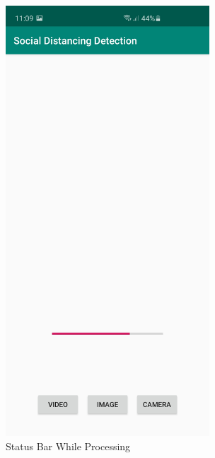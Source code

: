     \begin{figure}[h!]
        \centering
        \begin{subfigure}{.5\textwidth}
        \centering
        \includegraphics[width=3in]{images/appendix-a/sh-processing.jpg}
        \caption{Status Bar While Processing}
        \label{distanceCalculation}
        \end{subfigure}%
        \begin{subfigure}{.5\textwidth}
        \centering

\end{subfigure}
\end{figure}
